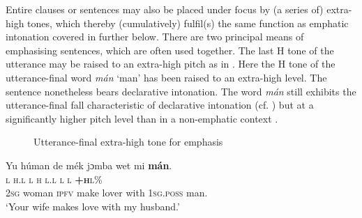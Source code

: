 Entire clauses or sentences may also be placed under focus  by (a series of) extra-high tones, which thereby (cumulatively) fulfil(s) the same function as emphatic intonation covered in  further below. There are two principal means of emphasising sentences, which are often used together. The last H tone of the utterance may be raised to an extra-high pitch as in . Here the H tone of the utterance-final word \textit{mán} ‘man’ has been raised to an extra-high level. The sentence nonetheless bears declarative intonation. The word \textit{mán} still exhibits the utterance-final fall characteristic of declarative intonation (cf. ) but at a significantly higher pitch level than in a non-emphatic context .

\begin{figure}
\caption{Utterance-final extra-high tone for emphasis}
\label{fig:key:3.25}
\end{figure}
 


\ea%
    \label{ex:key:64}
    \glll   Yu  húman  de  mék    jɔmba  wet  mi    \textbf{mán}.\\
\textsc{l}  \textsc{h.l}    \textsc{l}  \textsc{h}    \textsc{l.l}    \textsc{l}  \textsc{l}    \textbf{\textsc{+h}}\textsc{l\%}\\
\textsc{2sg}  woman  \textsc{ipfv}  make  lover  with  \textsc{1sg.poss}  man.\\
\glt ‘Your wife makes love with my husband.’
\z

